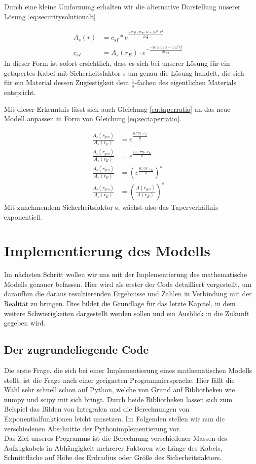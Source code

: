 \documentclass[a4paper, 10pt]{report}
\begin{document}
Durch eine kleine Umformung erhalten wir die alternative Darstellung unserer Lösung \ref{eq:securitysolutionalt}

\begin{align}
A_s(r) &= c_{sI} * e^{\frac{-2\varrho \cdot m_E \cdot G - \rho \omega^2 \cdot r^3}{2 r \frac{\sigma}{s}}}\label{eq:securitysolutionalt}\\
c_{sI} &= A_s(r_E) \cdot e^{- \frac{-2 c \varrho m_E G - \varrho \omega^2 r_E^3}{2 r_E \frac{\sigma}{s}}}
\label{eq:securityconstantalt}
\end{align}
In dieser Form ist sofort ersichtlich, dass es sich bei unserer Lösung für ein getapertes Kabel mit Sicherheitsfaktor s um genau die Lösung handelt, die sich für ein Material dessen Zugfestigkeit dem $\frac{1}{s}$-fachen des eigentlichen Materials entspricht.

Mit dieser Erkenntnis lässt sich auch Gleichung \ref{eq:taperratio} an das neue Modell anpassen in Form von Gleichung \ref{eq:sectaperratio}.

\begin{align}
\frac{A_s(r_{geo})}{A_s(r_E)} &= e^\frac{0,776 \cdot r_E}{\frac{h}{s}} \nonumber\\
\frac{A_s(r_{geo})}{A_s(r_E)} &= e^\frac{s \cdot 0,776 \cdot r_E}{h} \nonumber\\
\frac{A_s(r_{geo})}{A_s(r_E)} &= (e^\frac{0,776 \cdot r_E}{h})^s \nonumber\\
\frac{A_s(r_{geo})}{A_s(r_E)} &= (\frac{A(r_{geo})}{A(r_E)})^s
\label{eq:sectaperratio}
\end{align}
Mit zunehmendem Sicherheitsfaktor s, wächst also das Taperverhältnis exponentiell.

\chapter{Implementierung des Modells}
Im nächsten Schritt wollen wir uns mit der Implementierung des mathematische Modells genauer befassen. Hier wird als erster der Code detailliert vorgestellt, um daraufhin die daraus resultierenden Ergebnisse und Zahlen in Verbindung mit der Realität zu bringen. Dies bildet die Grundlage für das letzte Kapitel, in dem weitere Schwierigkeiten dargestellt werden sollen und ein Ausblick in die Zukunft gegeben wird.
\section{Der zugrundeliegende Code}
Die erste Frage, die sich bei einer Implementierung eines mathematischen Modells stellt, ist die Frage nach einer geeigneten Programmiersprache. Hier fällt die Wahl sehr schnell schon auf Python, welche von Grund auf Bibliotheken wie numpy und scipy mit sich bringt. Durch beide Bibliotheken lassen sich zum Beispiel das Bilden von Integralen und die Berechnungen von Exponentialfunktionen leicht umsetzen. 
Im Folgenden stellen wir nun die verschiedenen Abschnitte der Pythonimplementierung vor.\\
Das Ziel unseres Programms ist die Berechnung verschiedener Massen des Aufzugkabels in Abhängigkeit mehrerer Faktoren wie Länge des Kabels, Schnittfläche auf Höhe des Erdradius oder Größe des Sicherheitsfaktors.
 
\end{document}
